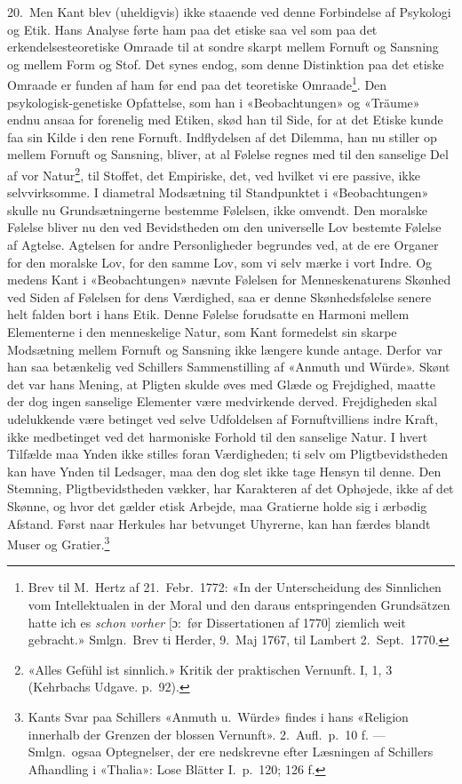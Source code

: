 \documentclass[12pt,a4paper]{article}
\newcommand{\apage}[1]{\marginnote{\footnotesize\textit{[#1]}}}
\begin{document}
20.\ Men Kant blev (uheldigvis) ikke staaende ved denne Forbindelse af
Psykologi og Etik. Hans Analyse førte ham paa det etiske saa vel som paa
det erkendelsesteoretiske Omraade til at sondre skarpt mellem Fornuft og
Sansning og mellem Form og Stof. Det synes endog, som denne Distinktion
paa det etiske Omraade er funden af ham før end paa det teoretiske
Omraade\footnote{Brev til M.\ Hertz af 21.\ Febr.\ 1772: «In der
Unterscheidung des Sinnlichen vom Intellektualen in der Moral und den
daraus entspringenden Grundsätzen hatte ich es \emph{schon vorher} [ɔ:\ før
Dissertationen af 1770] ziemlich weit gebracht.» Smlgn.\ Brev ti Herder,
9.\ Maj 1767, til Lambert 2.\ Sept.\ 1770.}. Den psykologisk-genetiske
Opfattelse, som han i «Beobachtungen» og «Träume» endnu ansaa for
forenelig med Etiken, skød han til Side, for at det Etiske kunde faa sin
Kilde i den rene Fornuft. Indflydelsen af det Dilemma, han nu stiller op
mellem Fornuft og Sansning, bliver, at al Følelse regnes med til den
sanselige Del af vor Natur\footnote{«Alles Gefühl ist sinnlich.»
Kritik der praktischen Vernunft. I, 1, 3 (Kehrbachs Udgave. p.\
92).}, til Stoffet, det Empiriske, det, ved hvilket vi ere passive, ikke
selvvirksomme. I diametral Modsætning til Standpunktet i «Beobachtungen»
skulle nu Grundsætningerne bestemme Følelsen, ikke omvendt. Den moralske
Følelse bliver nu den ved Bevidstheden om den universelle Lov bestemte
Følelse af Agtelse. Agtelsen for andre Personligheder begrundes ved, at
de ere Organer for den moralske Lov, for den samme Lov, som vi selv mærke
i vort Indre. Og medens Kant i «Beobachtungen» nævnte Følelsen for
Menneskenaturens Skønhed ved Siden af Følelsen for dens Værdighed, saa er
denne Skønhedsfølelse senere helt falden bort i hans Etik. Denne Følelse
forudsatte en Harmoni mellem Elementerne i den menneskelige Natur, som
Kant formedelst sin skarpe Modsætning mellem Fornuft og Sansning ikke
længere kunde antage. Derfor var han saa betænkelig ved Schillers
Sammenstilling af «Anmuth und Würde». Skønt det var hans Mening, at
Pligten skulde øves med Glæde og Frejdighed, maatte der dog ingen
sanselige Elementer være medvirkende derved. Frejdigheden skal
udelukkende være betinget ved selve Udfoldelsen af Fornuftvilliens indre
Kraft, ikke medbetinget ved det harmoniske Forhold til den sanselige
Natur. I hvert Tilfælde maa Ynden ikke stilles foran Værdigheden; ti selv
om Pligtbevidstheden kan have Ynden til Ledsager, maa den dog slet ikke
tage Hensyn til denne. Den Stemning, Pligtbevidstheden vækker, har
Karakteren af det Ophøjede, ikke af det Skønne, og hvor det gælder etisk
Arbejde, maa Gratierne holde sig i ærbødig Afstand. Først naar Herkules
har betvunget Uhyrerne, kan han færdes blandt Muser og
Gratier.\footnote{Kants Svar paa Schillers «Anmuth u.\ Würde» findes i
hans «Religion innerhalb der Grenzen der blossen Vernunft». 2.\ Aufl.\
p.\ 10 f. --- Smlgn.\ ogsaa Optegnelser, der ere nedskrevne efter
Læsningen af Schillers Afhandling i «Thalia»: Lose Blätter I.\
p.\ 120; 126 f.} \apage{41} 
\end{document}
